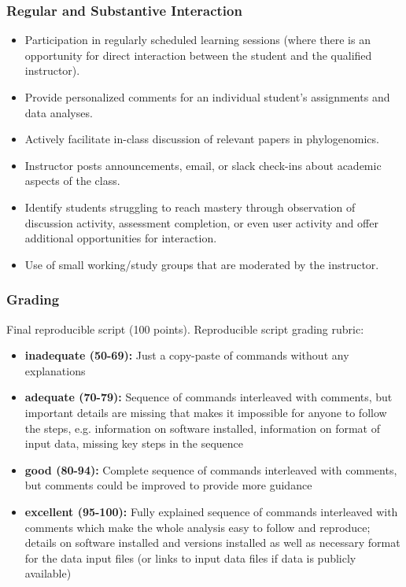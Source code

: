 \documentclass{article}
\begin{document}
\subsubsection*{Regular and Substantive Interaction}
\begin{itemize}
    \item Participation in regularly scheduled learning sessions (where there is an opportunity for direct interaction between the student and the qualified instructor).
    \item Provide personalized comments for an individual student's assignments and data analyses.
    \item Actively facilitate in-class discussion of relevant papers in phylogenomics.
    \item Instructor posts announcements, email, or slack check-ins about academic aspects of the class.
    \item Identify students struggling to reach mastery through observation of discussion activity, assessment completion, or even user activity and offer additional opportunities for interaction.
    \item Use of small working/study groups that are moderated by the instructor.
\end{itemize}


\subsubsection*{Grading}

Final reproducible script (100 points). Reproducible script grading rubric:
\begin{itemize}
    \item \textbf{inadequate (50-69):} Just a copy-paste of commands without any explanations
    \item \textbf{adequate (70-79):} Sequence of commands interleaved with comments, but important details are missing that makes it impossible for anyone to follow the steps, e.g. information on software installed, information on format of input data, missing key steps in the sequence
    \item \textbf{good (80-94):} Complete sequence of commands interleaved with comments, but comments could be improved to provide more guidance
    \item \textbf{excellent (95-100):} Fully explained sequence of commands interleaved with comments which make the whole analysis easy to follow and reproduce; details on software installed and versions installed as well as necessary format for the data input files (or links to input data files if data is publicly available)
\end{itemize}
\end{document}
